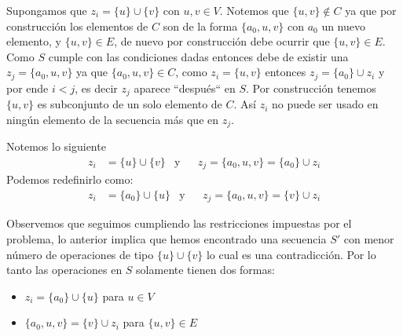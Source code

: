 \documentclass[spanish, xcolor=dvipsnames, aspectratio=169]{beamer}
\newcommand{\subsectiontitle}{}
\begin{document}
\begin{frame}{\subsectiontitle}
    Supongamos que \(z_{i} = \{ u \} \cup \{ v \}\) con 
    \(u, v \in V\).
    \newline 
    Notemos que \(\{u, v\} \notin C\) ya que por construcción los elementos de \(C\) son de la forma \(\{a_0, u, v\}\) con \(a_0\) un 
    nuevo elemento, y \(\{u, v\} \in E\), de nuevo por construcción debe ocurrir que \(\{u, v\} \in E\). 
    \newline
    Como \(S\) cumple con las condiciones dadas 
    entonces debe de existir una \(z_{j} = \{a_{0}, u, v\}\) ya que \(\{a_0, u, v\} \in C\), como \(z_{i} = \{u, v\}\) entonces \(z_{j} = \{a_{0}\} \cup z_{i}\)
    y por ende \(i < j\), es decir \(z_{j}\) aparece ``después`` en \(S\). 
    \newline
    Por construcción tenemos \(\{u, v\}\) es subconjunto de un solo elemento de \(C\).
    Así \(z_i\) no puede ser usado en ningún elemento de la secuencia más que en \(z_{j}\).
\end{frame}
\begin{frame}{\subsectiontitle}
    Notemos lo siguiente
    \begin{align*}
        z_{i} &= \{u\} \cup \{v\} &\text{y}& & z_{j} = \{a_0, u, v\} = \{a_0\} \cup z_{i}
    \end{align*}
    Podemos redefinirlo como:
    \begin{align*}
        z_{i} &= \{a_0\} \cup \{u\} &\text{y}&  & z_{j} = \{a_0, u, v\} = \{v\} \cup z_{i}
    \end{align*}
\end{frame}
\begin{frame}{\subsectiontitle}
    Observemos que seguimos cumpliendo las restricciones impuestas por el problema, lo anterior implica que 
    hemos encontrado una secuencia \(S'\) con menor número de operaciones de tipo \(\{u\} \cup \{v\}\) lo cual es una contradicción.
    Por lo tanto las operaciones en \(S\) solamente tienen dos formas:
    \begin{itemize}
        \item \(z_{i} = \{a_0\} \cup \{u\}\) para \(u \in V\)
        \item \(\{a_0, u, v\} = \{v\} \cup z_{i}\) para \(\{u, v\} \in E\)
    \end{itemize}
\end{frame}
\end{document}
